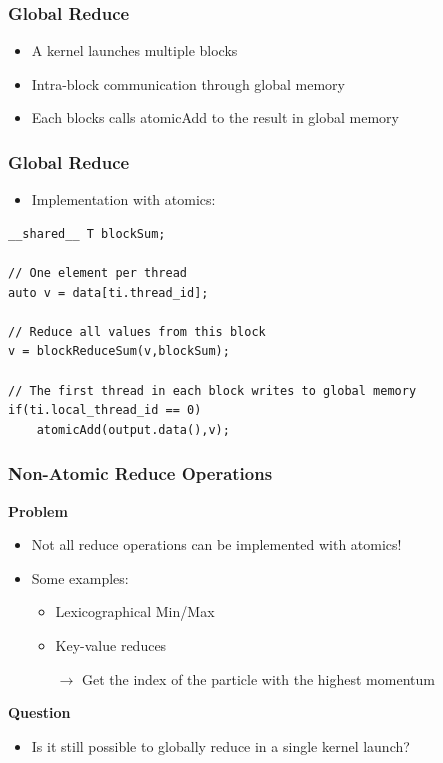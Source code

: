 \documentclass[aspectratio=169]{beamer}
\begin{document}
\begin{frame}[fragile]
\frametitle{Global Reduce}
\begin{itemize}
	\item A kernel launches multiple blocks
	\item<2-> Intra-block communication through global memory
	\item<3->[$\rightarrow$] Each blocks calls atomicAdd to the result in global memory
\end{itemize}


\end{frame}


\begin{frame}[fragile]
\frametitle{Global Reduce}
\begin{itemize}
	\item Implementation with atomics:
\end{itemize}

\begin{lstlisting}
__shared__ T blockSum;

// One element per thread
auto v = data[ti.thread_id];

// Reduce all values from this block
v = blockReduceSum(v,blockSum);

// The first thread in each block writes to global memory
if(ti.local_thread_id == 0)
	atomicAdd(output.data(),v);
\end{lstlisting}
\end{frame}


\frame
{	
	\frametitle{Non-Atomic Reduce Operations}
	\textbf{Problem}
	\begin{itemize}
		\item Not all reduce operations can be implemented with atomics!
		\item<2-> Some examples:
		\begin{itemize}
			\item Lexicographical Min/Max
			\item Key-value reduces
			\item[$\rightarrow$] Get the index of the particle with the highest momentum
		\end{itemize}		
	\end{itemize}
\textbf{Question}
	\begin{itemize}
	\item Is it still possible to globally reduce in a single kernel launch?
		\end{itemize}
}
\end{document}
